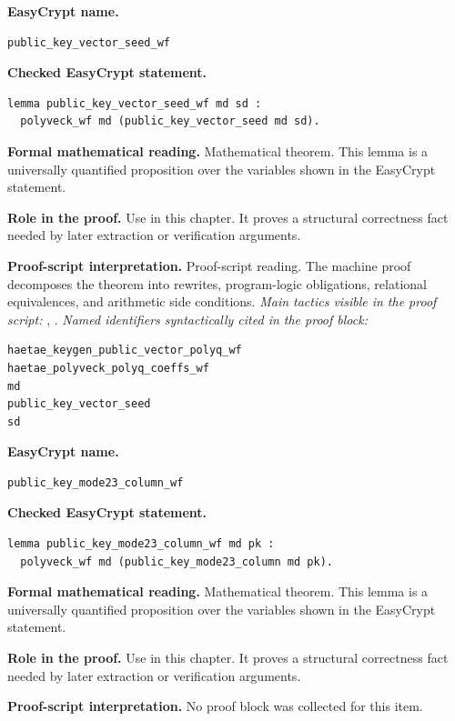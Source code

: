 \begin{formaltheorem}
\noindent\textbf{EasyCrypt name.}
\begin{lstlisting}[language=EasyCrypt,basicstyle=\ttfamily\scriptsize]
public_key_vector_seed_wf
\end{lstlisting}
\noindent\textbf{Checked EasyCrypt statement.}
\begin{lstlisting}[language=EasyCrypt,basicstyle=\ttfamily\scriptsize]
lemma public_key_vector_seed_wf md sd :
  polyveck_wf md (public_key_vector_seed md sd).
\end{lstlisting}
\noindent\textbf{Formal mathematical reading.}
Mathematical theorem. This lemma is a universally quantified proposition over the variables shown in the EasyCrypt statement.

\noindent\textbf{Role in the proof.}
Use in this chapter. It proves a structural correctness fact needed by later extraction or verification arguments.

\noindent\textbf{Proof-script interpretation.}
Proof-script reading. The machine proof decomposes the theorem into rewrites, program-logic obligations, relational equivalences, and arithmetic side conditions.
\emph{Main tactics visible in the proof script:} , .
\emph{Named identifiers syntactically cited in the proof block:}
\begin{lstlisting}[language=EasyCrypt,basicstyle=\ttfamily\scriptsize]
haetae_keygen_public_vector_polyq_wf
haetae_polyveck_polyq_coeffs_wf
md
public_key_vector_seed
sd
\end{lstlisting}

\end{formaltheorem}

\begin{formaltheorem}
\noindent\textbf{EasyCrypt name.}
\begin{lstlisting}[language=EasyCrypt,basicstyle=\ttfamily\scriptsize]
public_key_mode23_column_wf
\end{lstlisting}
\noindent\textbf{Checked EasyCrypt statement.}
\begin{lstlisting}[language=EasyCrypt,basicstyle=\ttfamily\scriptsize]
lemma public_key_mode23_column_wf md pk :
  polyveck_wf md (public_key_mode23_column md pk).
\end{lstlisting}
\noindent\textbf{Formal mathematical reading.}
Mathematical theorem. This lemma is a universally quantified proposition over the variables shown in the EasyCrypt statement.

\noindent\textbf{Role in the proof.}
Use in this chapter. It proves a structural correctness fact needed by later extraction or verification arguments.

\noindent\textbf{Proof-script interpretation.}
No proof block was collected for this item.

\end{formaltheorem}

